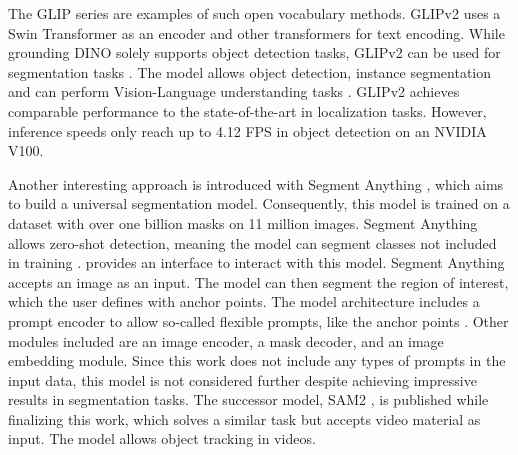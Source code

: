 \noindent The GLIP series \cite{GLIPv12022} \cite{glipv22022} are examples of such open vocabulary methods.
GLIPv2 uses a Swin Transformer \cite{swinTransformer2021} as an encoder and other transformers for text encoding.
While grounding DINO solely supports object detection tasks, GLIPv2 can be used for segmentation tasks \cite{groundingdino2024}.
The model allows object detection, instance segmentation and can perform Vision-Language understanding tasks \cite{glipv22022}.
GLIPv2 achieves comparable performance to the state-of-the-art in localization tasks.
However, inference speeds only reach up to 4.12 FPS in object detection on an NVIDIA V100.

\vspace{0.5cm}

\noindent Another interesting approach is introduced with Segment Anything \cite{segmentAnything2023}, which aims to build a universal segmentation model.
Consequently, this model is trained on a dataset with over one billion masks on 11 million images.
Segment Anything \cite{segmentAnything2023} allows zero-shot detection, meaning the model can segment classes not included in training \cite{segmentAnything2023} \cite{openvocabularysurvey2024}.
\cite{segmentAnythingOnline} provides an interface to interact with this model.
Segment Anything accepts an image as an input.
The model can then segment the region of interest, which the user defines with anchor points.
The model architecture includes a prompt encoder to allow so-called flexible prompts, like the anchor points \cite{segmentAnything2023}.
Other modules included are an image encoder, a mask decoder, and an image embedding module.
Since this work does not include any types of prompts in the input data, this model is not considered further despite achieving impressive results in segmentation tasks.
The successor model, \ac{SAM2} \cite{segmentAnything22024}, is published while finalizing this work, which solves a similar task but accepts video material as input.
The model allows object tracking in videos.

